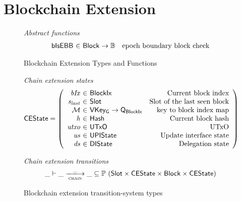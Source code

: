 \documentclass[11pt,a4paper]{article}
\newcommand{\powerset}[1]{\mathbb{P}~#1}
\newcommand{\var}[1]{\mathit{#1}}
\newcommand{\fun}[1]{\mathsf{#1}}
\newcommand{\type}[1]{\mathsf{#1}}
\newcommand{\trans}[2]{\xlongrightarrow[\textsc{#1}]{#2}}
\newcommand{\totalf}{\to}
\newcommand{\Hash}{\type{Hash}}  %
\newcommand{\Slot}{\type{Slot}}
\newcommand{\BlockIx}{\type{BlockIx}}
\newcommand{\Block}{\type{Block}}
\newcommand{\Queue}{\type{Q}}
\newcommand{\VKeyGen}{\type{VKey_G}}
\newcommand{\signmapname}{\mathcal{M}}
\newcommand{\isebbname}{bIsEBB}
\begin{document}
\clearpage

\section{Blockchain Extension}
\label{sec:chain-extension}

\newcommand{\CEEnv}{\type{CEEnv}}
\newcommand{\CEState}{\type{CEState}}


\begin{figure}[ht]
  \emph{Abstract functions}
  \begin{equation*}
    \begin{array}{r@{~\in~}lr}
      \fun{\isebbname} & \Block \totalf \mathbb{B} & \text{epoch boundary block check} \\
    \end{array}
  \end{equation*}
  \caption{Blockchain Extension Types and Functions}
  \label{fig:defs:chain-extension}
\end{figure}

\begin{figure}[ht]
  \emph{Chain extension states}
  \begin{equation*}
    \CEState =
    \left(
      \begin{array}{r@{~\in~}lr}
        \var{bIx} & \BlockIx & \text{Current block index} \\
        \var{s_{last}} & \Slot & \text{Slot of the last seen block} \\
        \signmapname & \VKeyGen \totalf \Queue_\BlockIx & \text{key to block index map} \\
        \var{h} & \Hash & \text{Current block hash} \\
        \var{utxo} & \UTxO & \text{UTxO} \\
        \var{us} & \UPIState & \text{Update interface state} \\
        \var{ds} & \DIState & \text{Delegation state}
      \end{array}
    \right)
  \end{equation*}

  \emph{Chain extension transitions}
  \begin{equation*}
    \_ \vdash \var{\_} \trans{chain}{\_} \var{\_} \subseteq
    \powerset (\Slot \times \CEState \times \Block \times \CEState)
  \end{equation*}

  \caption{Blockchain extension transition-system types}
  \label{fig:ts-types:chain-extension}
\end{figure}
\end{document}
